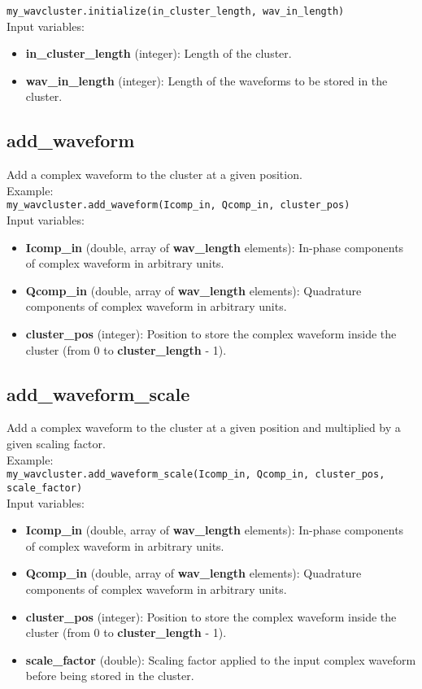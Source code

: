 \texttt{my\_wavcluster.initialize(in\_cluster\_length, wav\_in\_length)}\\

Input variables:
\begin{itemize}
\item {\bf in\_cluster\_length} (integer): Length of the cluster.
\item {\bf wav\_in\_length} (integer): Length of the waveforms to be stored in the cluster.
\end{itemize}


\subsection{add\_waveform}

Add a complex waveform to the cluster at a given position.\\

Example:\\

\texttt{my\_wavcluster.add\_waveform(Icomp\_in, Qcomp\_in, cluster\_pos)}\\

Input variables:
\begin{itemize}
\item {\bf Icomp\_in} (double, array of {\bf wav\_length} elements): In-phase components of complex waveform in arbitrary units.
\item {\bf Qcomp\_in} (double, array of {\bf wav\_length} elements): Quadrature components of complex waveform in arbitrary units.
\item {\bf cluster\_pos} (integer): Position to store the complex waveform inside the cluster (from 0 to {\bf cluster\_length} - 1).
\end{itemize}


\subsection{add\_waveform\_scale}

Add a complex waveform to the cluster at a given position and multiplied by a given scaling factor.\\

Example:\\

\texttt{my\_wavcluster.add\_waveform\_scale(Icomp\_in, Qcomp\_in, cluster\_pos, scale\_factor)}\\

Input variables:
\begin{itemize}
\item {\bf Icomp\_in} (double, array of {\bf wav\_length} elements): In-phase components of complex waveform in arbitrary units.
\item {\bf Qcomp\_in} (double, array of {\bf wav\_length} elements): Quadrature components of complex waveform in arbitrary units.
\item {\bf cluster\_pos} (integer): Position to store the complex waveform inside the cluster (from 0 to {\bf cluster\_length} - 1).
\item {\bf scale\_factor} (double): Scaling factor applied to the input complex waveform before being stored in the cluster.
\end{itemize}


